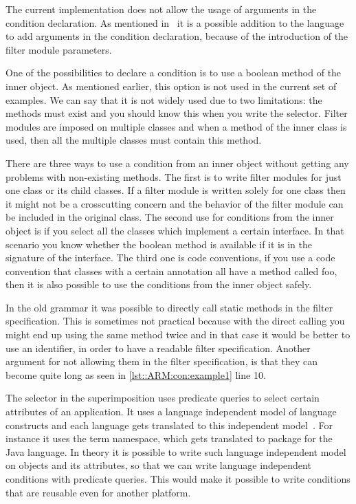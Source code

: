 The current implementation does not allow the usage of arguments in the condition declaration.
As mentioned in~\cite{Doornenbal2006}
it is a possible addition to the language to add arguments in the condition declaration, because of the introduction of the filter module parameters.

One of the possibilities to declare a condition is to use a boolean method of the inner object. As mentioned earlier, this option is not used in the current set of examples. We can say that it is not widely used due to two limitations:
the methods must exist and you should know this when you write the selector. Filter modules are imposed on
multiple classes and when a method of the inner class is used, then all the multiple classes must contain
this method.

There are three ways to use a condition from an inner object without getting any problems with non-existing
methods. The first is to write filter modules for just one class or its child classes. If a filter module is written solely for one class then it might not be a crosscutting concern and the behavior of the filter module can be included in the original class.
The second use for conditions from the inner object is if you select all the classes which implement
a certain interface. In that scenario you know whether the boolean method is available if it is in the signature of the interface.
The third one is code conventions, if you use a code convention that classes with a certain annotation all have a method called foo, then it is also possible to use the conditions from the inner object safely.

In the old grammar it was possible to directly call static methods in the filter specification. This is sometimes not practical because with the direct calling you might end up using the same method twice and in that case it would be better to use an
identifier, in order to have a readable filter specification. Another argument for not allowing them in the filter specification, is that they can become quite long as seen in \autoref{lst::ARM:con:example1} line 10.

The selector in the superimposition uses predicate queries to select certain attributes of an application. It uses
a language independent model of language constructs and each language gets translated to this independent model~\cite{Havinga2005}. For instance it
uses the term namespace, which gets translated to package for the Java language. In theory it is possible
to write such language independent model on objects and its attributes, so that we can write language independent conditions
with predicate queries. This would make it possible to write conditions that are reusable even for another platform.